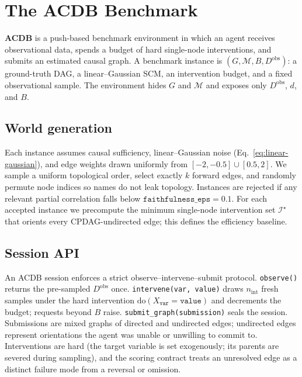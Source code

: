 \section{The ACDB Benchmark}
\label{sec:benchmark}

\textbf{ACDB} is a push-based benchmark environment in which an agent receives observational data, spends a budget of hard single-node interventions, and submits an estimated causal graph. A benchmark instance is $(G, \mathcal{M}, B, D^{\mathrm{obs}})$: a ground-truth DAG, a linear--Gaussian SCM, an intervention budget, and a fixed observational sample. The environment hides $G$ and $\mathcal{M}$ and exposes only $D^{\mathrm{obs}}$, $d$, and $B$.

\subsection{World generation}

Each instance assumes causal sufficiency, linear--Gaussian noise (Eq.~\ref{eq:linear-gaussian}), and edge weights drawn uniformly from $[-2,-0.5]\cup[0.5,2]$. We sample a uniform topological order, select exactly $k$ forward edges, and randomly permute node indices so names do not leak topology. Instances are rejected if any relevant partial correlation falls below $\texttt{faithfulness\_eps}=0.1$. For each accepted instance we precompute the minimum single-node intervention set $\mathcal{I}^\star$ that orients every CPDAG-undirected edge; this defines the efficiency baseline.

\subsection{Session API}

An ACDB session enforces a strict observe--intervene--submit protocol. \texttt{observe()} returns the pre-sampled $D^{\mathrm{obs}}$ once. \texttt{intervene(var, value)} draws $n_{\mathrm{int}}$ fresh samples under the hard intervention $\mathrm{do}(X_{\texttt{var}} = \texttt{value})$ and decrements the budget; requests beyond $B$ raise. \texttt{submit\_graph(submission)} seals the session. Submissions are mixed graphs of directed and undirected edges; undirected edges represent orientations the agent was unable or unwilling to commit to. Interventions are hard (the target variable is set exogenously; its parents are severed during sampling), and the scoring contract treats an unresolved edge as a distinct failure mode from a reversal or omission.

